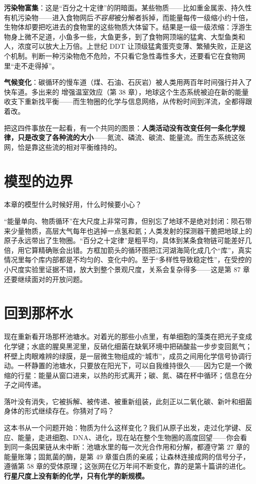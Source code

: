 \textbf{污染物富集}：这是“百分之十定律”的阴暗面。某些物质——比如重金属汞、持久性有机污染物——进入食物网后\emph{不容易}被分解者拆掉，而能量每传一级缩小约十倍，生物体却要把吃进去的食物里的这些物质大体留下。结果是一级一级浓缩：浮游生物身上微不足道，小鱼多一些，大鱼更多，到了食物网顶端的猛禽、大型鱼类和人，浓度可以放大上万倍。上世纪 DDT 让顶级猛禽蛋壳变薄、繁殖失败，正是这个机制。判断一种污染物危不危险，不只看它急性毒性多大，还要看它在食物网里“走不走得掉”。

\textbf{气候变化}：碳循环的慢车道（煤、石油、石灰岩）被人类用两百年时间强行并入了快车道。多出来的  增强温室效应（第 38 章），地球这个生态系统被迫在新的能量收支下重新找平衡——而生物圈的化学与信息网络，从传粉时间到洋流，全都得跟着改。

把这四件事放在一起看，有一个共同的图景：\textbf{人类活动没有改变任何一条化学规律，只是改变了各种流的大小}——氮流、磷流、碳流、能量流。而生态系统这张网，恰是靠这些流的相对平衡维持的。

\section{模型的边界}

本章的模型什么时候好用，什么时候要小心？

“能量单向、物质循环”在大尺度上非常可靠，但别忘了地球不是绝对封闭：陨石带来少量物质，高层大气每年也逃掉一点氢和氦；人类发射的探测器干脆把地球上的原子永远带出了生物圈。“百分之十定律”是粗平均，具体到某条食物链可能差好几倍，用它算精确账会出错。方框加箭头的循环图把江河湖海简化成几个“库”，真实情况里每个库内部都是不均匀的、变化中的。至于“多样性导致稳定性”，在受控的小尺度实验里证据不错，放大到整个景观尺度，关系会复杂得多——这是第 87 章还要继续面对的开放问题。

\section{回到那杯水}

现在重新看开场那杯池塘水。对着光的那些小点里，有单细胞的藻类在把光子变成化学键；水底的腥臭黑泥里，反硝化细菌在缺氧环境中把硝酸盐一步步变回氮气；杯壁上肉眼难辨的绿膜，是一层微生物组成的“城市”，成员之间用化学信号协调行动。一杯静置的池塘水，只要放在阳光下，可以自我维持很久——因为它是一个微缩的行星：能量从窗口进来，以热的形式离开；碳、氮、磷在杯中循环；信息在分子之间传递。

落叶没有消失，它被拆解、被传递、被重新组装，此刻正以二氧化碳、新叶和细菌身体的形式继续存在。你猜对了吗？

这本书从一个问题开始：物质为什么这样变化？我们从原子出发，走过化学键、反应、能量，走进细胞、DNA、进化，现在站在整个生物圈的高度回望——你会看到同一条因果链从未中断：池塘水里的每一次光合作用和分解，都遵守第 27 章的能量账簿；固氮菌的酶，是第 49 章蛋白质的亲戚；让森林连接成网的信号分子，遵循第 58 章的受体原理；这张网在亿万年间不断变化，靠的是第十篇讲的进化。\textbf{行星尺度上没有新的化学，只有化学的新规模。}

